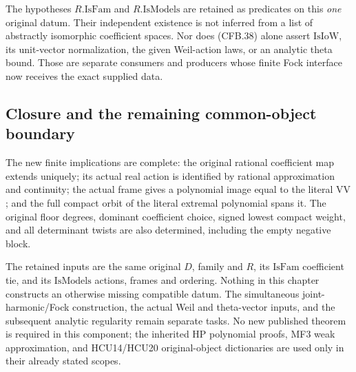The hypotheses \(R.\mathrm{IsFam}\) and
\(R.\mathrm{IsModels}\) are retained as predicates on this
\emph{one} original datum.  Their independent existence is not
inferred from a list of abstractly isomorphic coefficient spaces.
Nor does (CFB.38) alone assert \(\mathrm{IsIoW}\), its
unit-vector normalization, the given Weil-action laws, or an
analytic theta bound.  Those are separate consumers and producers
whose finite Fock interface now receives the exact supplied data.

\subsection*{Closure and the remaining common-object boundary}

The new finite implications are complete: the original rational
coefficient map extends uniquely; its actual real action is
identified by rational approximation and continuity; the actual
frame gives a polynomial image equal to the literal \(\mathrm{VV}\);
and the full compact orbit of the literal extremal polynomial
spans it.  The original floor degrees, dominant coefficient choice,
signed lowest compact weight, and all determinant twists are also
determined, including the empty negative block.

The retained inputs are the same original \(D\), family and
\(R\), its \(\mathrm{IsFam}\) coefficient tie, and its
\(\mathrm{IsModels}\) actions, frames and ordering.  Nothing in
this chapter constructs an otherwise missing compatible datum.
The simultaneous joint-harmonic/Fock construction, the actual Weil
and theta-vector inputs, and the subsequent analytic regularity
remain separate tasks.  No new published theorem is required in
this component; the inherited HP polynomial proofs, MF3 weak
approximation, and HCU14/HCU20 original-object dictionaries are
used only in their already stated scopes.
